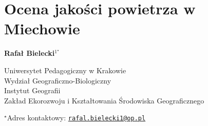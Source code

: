\documentclass[\main/boa.tex]{subfiles}
\begin{document}
\section{Ocena jakości powietrza w Miechowie}

\begin{center}
  {\bf {} Rafał Bielecki$^{1^\star}$}
\end{center}

\vskip 0.3cm

\begin{affiliations}
\begin{enumerate}
\begin{minipage}{0.915\textwidth}
\centering
\item Uniwersytet Pedagogiczny w Krakowie \\ Wydział Geograficzno-Biologiczny  \\ Instytut Geografii \\
Zakład Ekorozwoju i Kształtowania Środowiska Geograficznego \\[-2pt]
\end{minipage}
\end{enumerate}
$^\star$Adres kontaktowy: \href{mailto:rafal.bielecki1@op.pl}{\nolinkurl{rafal.bielecki1@op.pl}}\\
\end{affiliations}

\vskip 0.5cm


\vskip 0.5cm
\end{document}
